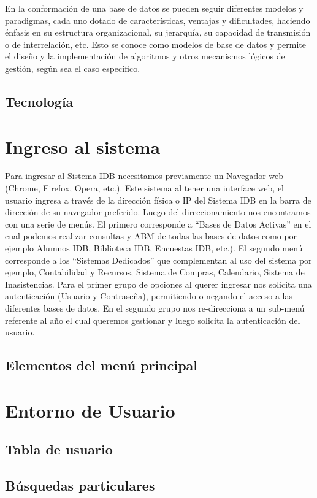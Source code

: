 \documentclass[a4paper,10pt]{article}
\begin{document}
En la conformación de una base de datos se pueden seguir diferentes modelos y 
paradigmas, cada uno dotado de características, ventajas y dificultades, 
haciendo énfasis en su estructura organizacional, su jerarquía, su capacidad de 
transmisión o de interrelación, etc. Esto se conoce como modelos de base de 
datos y permite el diseño y la implementación de algoritmos y otros mecanismos 
lógicos de gestión, según sea el caso específico.
\subsection{Tecnología}

\section{Ingreso al sistema}
Para ingresar al Sistema IDB necesitamos previamente un Navegador web (Chrome, Firefox, Opera, etc.). Este sistema al tener una interface web, el usuario ingresa a través de la dirección física o IP del Sistema IDB en la barra de dirección de su navegador preferido. Luego del direccionamiento nos encontramos con una serie de menús. El primero corresponde a “Bases de Datos Activas” en el cual podemos realizar consultas y ABM de todas las bases de datos como por ejemplo Alumnos IDB, Biblioteca IDB, Encuestas IDB, etc.). El segundo menú corresponde a los “Sistemas Dedicados” que complementan al uso del sistema por ejemplo, Contabilidad y Recursos, Sistema de Compras, Calendario, Sistema de Inasistencias.
Para el primer grupo de opciones al querer ingresar nos solicita una autenticación (Usuario y Contraseña), permitiendo o negando el acceso a las diferentes bases de datos. 
En el segundo grupo nos re-direcciona a un sub-menú referente al año el cual queremos gestionar y luego solicita la autenticación del usuario. 
 
\subsection{Elementos del menú principal}
\section{Entorno de Usuario}
\subsection{Tabla de usuario}
\subsection{Búsquedas particulares}
\end{document}

